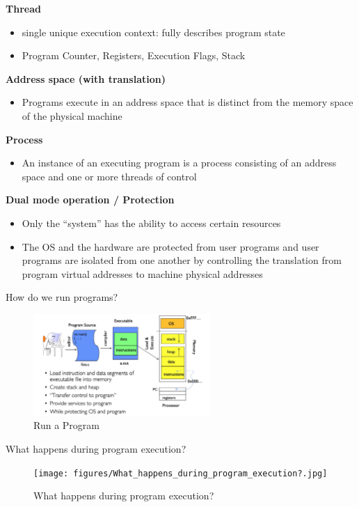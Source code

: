 \noindent\textbf{Thread}
\begin{itemize}
    \item single unique execution context: fully describes program state
    \item Program Counter, Registers, Execution Flags, Stack
\end{itemize}
\textbf{Address space (with translation)}
\begin{itemize}
    \item Programs execute in an address space that is distinct from the memory
space of the physical machine
\end{itemize}
\textbf{Process}
\begin{itemize}
    \item An instance of an executing program is a process consisting of an address space and one or more threads of control
\end{itemize}
\textbf{Dual mode operation / Protection}
\begin{itemize}
    \item Only the ``system'' has the ability to access certain resources
    \item The OS and the hardware are protected from user programs and user programs are isolated from one another by controlling the translation from program virtual addresses to machine physical addresses
\end{itemize}
\begin{discussion}
How do we run programs?
\end{discussion}
\begin{figure}[H]
    \centering
    \includegraphics[width = 0.6\textwidth ]{figures/run_program.jpg}
    \caption{Run a Program}
\end{figure}

\begin{discussion}
What happens during program execution?
\end{discussion}
\begin{figure}[H]
    \centering
    \texttt{[image: figures/What\_happens\_during\_program\_execution?.jpg]}
    \caption{What happens during program execution?}
\end{figure}
